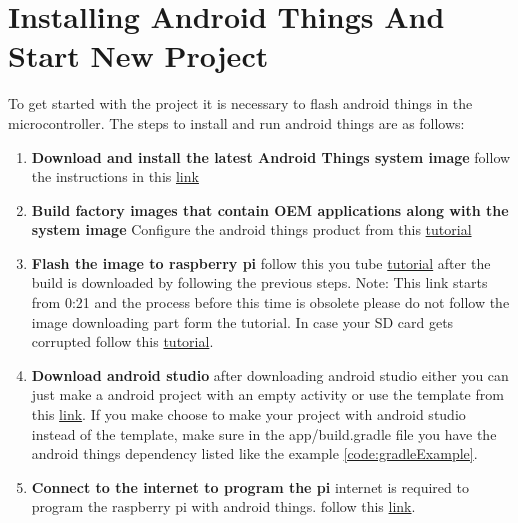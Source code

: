 \section{Installing Android Things And Start New Project}
To get started with the project it is necessary to flash android things in the
microcontroller. The steps to install and run android things are as follows:
\begin{enumerate}
    \item 
        \textbf{Download and install the latest Android Things system image}
            follow the instructions in this \href{https://developer.android.com/things/console/create.html}
            {link}
    \item 
        \textbf{Build factory images that contain OEM applications along with the system image}
                Configure the android things product from this \href{https://developer.android.com/things/console/configure.html}
                {tutorial}
    \item 
    \textbf{Flash the image to raspberry pi}
        follow this you tube
        \href{https://youtu.be/9_ePSCjrQsQ?t=21}{tutorial} after the build is downloaded by following the previous steps.
        Note: This link starts from 0:21 and the process before this time is obsolete
        please do not follow the image downloading part form the tutorial.
        In case your SD card gets corrupted follow this \href{https://youtu.be/cguJpeDRfbc?list=PLr1nMHB-ifhF_3Q92jFqGUgqfABwFIKgZ}
        {tutorial}.               
    \item 
        \textbf{Download android studio}
            after downloading android studio either you can just make a android project 
            with an empty activity or use the template from this \href{https://github.com/androidthings/new-project-template}
            {link}.
            If you make choose to make your project with android studio instead of the
            template, make sure in the app/build.gradle file you have the android things
            dependency listed like the example \ref{code:gradleExample}.
    \item 
        \textbf{Connect to the internet to program the pi}
            internet is required to program the raspberry pi with android things.
            follow this \href{https://developer.android.com/things/hardware/raspberrypi.html}
            {link}.                                  
\end{enumerate}